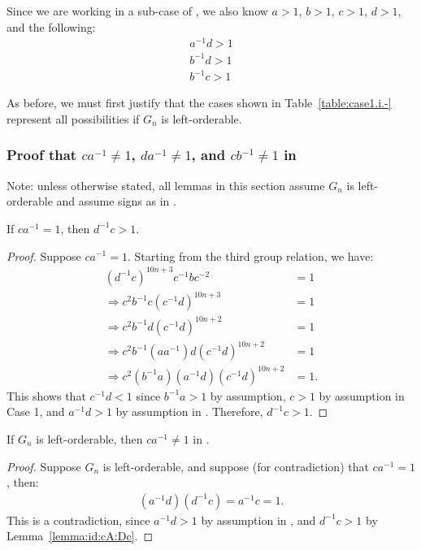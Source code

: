 \noindent{}Since we are working in a sub-case of , we also know $a>1$, $b>1$, $c>1$, $d>1$, and the following:
\begin{align} a^{-1}d>1\label{case1.i:inEq:Ad}\\
b^{-1}d>1\label{case1.i:inEq:Bd}\\
b^{-1}c>1
\end{align}

\noindent{}As before, we must first justify that the cases shown in Table~\ref{table:case1.i.-} represent all possibilities if $G_n$ is left-orderable.

\subsubsection{Proof that $ca^{-1}\neq{}1$, $da^{-1}\neq{}1$, and $cb^{-1}\neq{}1$ in }

\noindent{}Note: unless otherwise stated, all lemmas in this section assume $G_n$ is left-orderable and assume signs as in .

\begin{lemma} If $ca^{-1}=1$, then $d^{-1}c>1$.
\label{lemma:id:cA:Dc}
\end{lemma}
\begin{proof} Suppose $ca^{-1}=1$. Starting from the third group relation, we have:
\begin{align*}
(d^{-1}c)^{10n+3}c^{-1}bc^{-2}&=1\\
\Rightarrow{}c^{2}b^{-1}c(c^{-1}d)^{10n+3}&=1\\
\Rightarrow{}c^{2}b^{-1}d(c^{-1}d)^{10n+2}&=1\\
\Rightarrow{}c^{2}b^{-1}(aa^{-1})d(c^{-1}d)^{10n+2}&=1\\
\Rightarrow{}c^{2}(b^{-1}a)(a^{-1}d)(c^{-1}d)^{10n+2}&=1.
\end{align*}
This shows that $c^{-1}d<1$ since $b^{-1}a>1$ by assumption, $c>1$ by assumption in Case 1, and $a^{-1}d>1$ by assumption in . Therefore, $d^{-1}c>1$.
\end{proof}

\begin{proposition} If $G_n$ is left-orderable, then $ca^{-1}\neq{}1$ in .
\label{proposition:id:cA}
\end{proposition}
\begin{proof} Suppose $G_n$ is left-orderable, and suppose (for contradiction) that $ca^{-1}=1$, then:
\begin{align*}
(a^{-1}d)(d^{-1}c)=a^{-1}c=1.
\end{align*}
This is a contradiction, since $a^{-1}d>1$ by assumption in , and $d^{-1}c>1$ by Lemma~\ref{lemma:id:cA:Dc}.
\end{proof}

